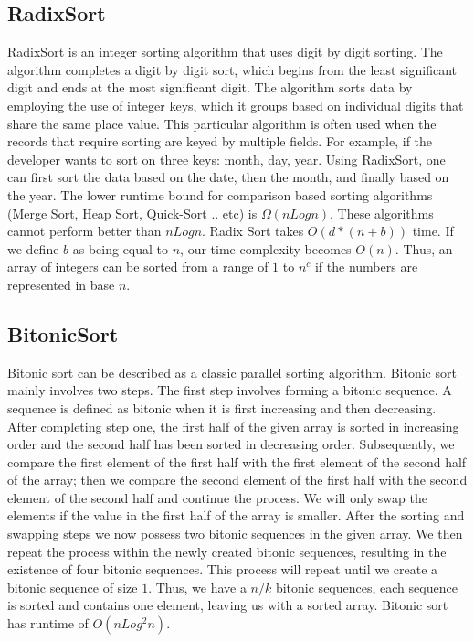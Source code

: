 \documentclass[11pt,twocolumn]{article}
\begin{document}
\subsection{RadixSort}
RadixSort is an integer sorting algorithm that uses digit by digit sorting. The algorithm completes a digit by digit sort, which begins from the least significant digit and ends at the most significant digit. The algorithm sorts data by employing the use of integer keys, which it groups based on individual digits that share the same place value. This particular algorithm is often used when the records that require sorting are keyed by multiple fields. For example, if the developer wants to sort on three keys: month, day, year. Using RadixSort, one can first sort the data based on the date, then the month, and finally based on the year. The lower runtime bound for comparison based sorting algorithms (Merge Sort, Heap Sort, Quick-Sort .. etc) is $\Omega(nLogn)$. These algorithms cannot perform better than $nLogn$. Radix Sort takes $O(d*(n+b))$ time. If we define $b$ as being equal to $n$, our time complexity becomes $O(n)$. Thus, an array of integers can be sorted from a range of $1$ to $n^c$ if the numbers are represented in base $n$. 

\subsection{BitonicSort} 
Bitonic sort can be described as a classic parallel sorting algorithm. Bitonic sort mainly involves two steps. The first step involves forming a bitonic sequence. A sequence is defined as bitonic when it is first increasing and then decreasing. After completing step one, the first half of the given array is sorted in increasing order and the second half has been sorted in decreasing order. Subsequently, we compare the first element of the first half with the first element of the second half of the array; then we compare the second element of the first half with the second element of the second half and continue the process. We will only swap the elements if the value in the first half of the array is smaller. After the sorting and swapping steps we now possess two bitonic sequences in the given array. We then repeat the process within the newly created bitonic sequences, resulting in the existence of four bitonic sequences. This process will repeat until we create a bitonic sequence of size $1$. Thus, we have a $n/k$ bitonic sequences, each sequence is sorted and contains one element, leaving us with a sorted array. Bitonic sort has runtime of $O(nLog^2n)$.    
\end{document}
